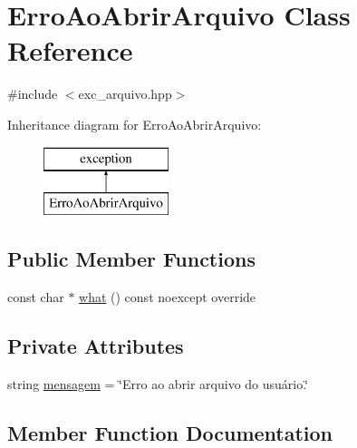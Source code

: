 \hypertarget{classErroAoAbrirArquivo}{}\section{Erro\+Ao\+Abrir\+Arquivo Class Reference}
\label{classErroAoAbrirArquivo}


{\ttfamily \#include $<$exc\+\_\+arquivo.\+hpp$>$}

Inheritance diagram for Erro\+Ao\+Abrir\+Arquivo\+:\begin{figure}[H]
\begin{center}
\leavevmode
\includegraphics[height=2.000000cm]{classErroAoAbrirArquivo}
\end{center}
\end{figure}
\subsection*{Public Member Functions}
\begin{DoxyCompactItemize}
\item 
const char $\ast$ \hyperlink{classErroAoAbrirArquivo_a76820759458b6b1a6d89f2c685603ccd}{what} () const noexcept override
\end{DoxyCompactItemize}
\subsection*{Private Attributes}
\begin{DoxyCompactItemize}
\item 
string \hyperlink{classErroAoAbrirArquivo_a96c16ba42b2fbb0cfb8aed38801748f0}{mensagem} = \char`\"{}Erro ao abrir arquivo do usuário.\char`\"{}
\end{DoxyCompactItemize}


\subsection{Member Function Documentation}
\mbox{\label{classErroAoAbrirArquivo_a76820759458b6b1a6d89f2c685603ccd}} 
